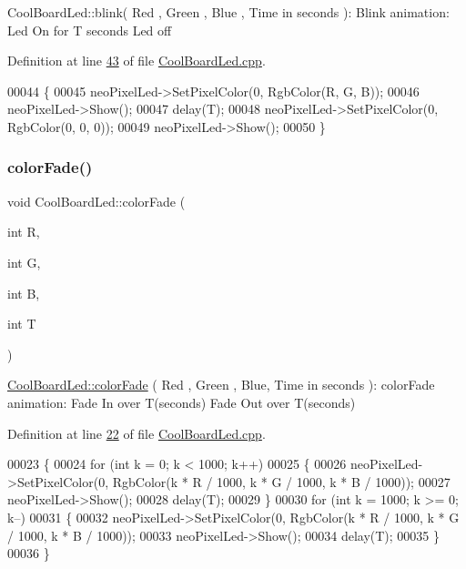 Cool\+Board\+Led\+::blink( Red , Green , Blue , Time in seconds )\+: Blink animation\+: Led On for T seconds Led off 

Definition at line \hyperlink{_cool_board_led_8cpp_source_l00043}{43} of file \hyperlink{_cool_board_led_8cpp_source}{Cool\+Board\+Led.\+cpp}.


\begin{DoxyCode}
00044 \{
00045     neoPixelLed->SetPixelColor(0, RgbColor(R, G, B));
00046     neoPixelLed->Show();
00047     delay(T);
00048     neoPixelLed->SetPixelColor(0, RgbColor(0, 0, 0));
00049     neoPixelLed->Show();
00050 \}
\end{DoxyCode}
\mbox{\label{class_cool_board_led_a6dbfe23988f43e1242cd05e69b13ff30}} 
\subsubsection{\texorpdfstring{color\+Fade()}{colorFade()}}
{\footnotesize\ttfamily void Cool\+Board\+Led\+::color\+Fade (\begin{DoxyParamCaption}\item[{int}]{R,  }\item[{int}]{G,  }\item[{int}]{B,  }\item[{int}]{T }\end{DoxyParamCaption})}

\hyperlink{class_cool_board_led_a6dbfe23988f43e1242cd05e69b13ff30}{Cool\+Board\+Led\+::color\+Fade} ( Red , Green , Blue, Time in seconds )\+: color\+Fade animation\+: Fade In over T(seconds) Fade Out over T(seconds) 

Definition at line \hyperlink{_cool_board_led_8cpp_source_l00022}{22} of file \hyperlink{_cool_board_led_8cpp_source}{Cool\+Board\+Led.\+cpp}.


\begin{DoxyCode}
00023 \{
00024     \textcolor{keywordflow}{for} (\textcolor{keywordtype}{int} k = 0; k < 1000; k++) 
00025     \{
00026         neoPixelLed->SetPixelColor(0, RgbColor(k * R / 1000, k * G / 1000, k * B / 1000));
00027         neoPixelLed->Show();
00028         delay(T);
00029     \}
00030     \textcolor{keywordflow}{for} (\textcolor{keywordtype}{int} k = 1000; k >= 0; k--) 
00031     \{
00032         neoPixelLed->SetPixelColor(0, RgbColor(k * R / 1000, k * G / 1000, k * B / 1000));
00033         neoPixelLed->Show();
00034         delay(T);
00035     \}
00036 \}
\end{DoxyCode}
\mbox{\label{class_cool_board_led_a1b60e5e30bea96c49ed62ed1bf1ffc8b}} 
